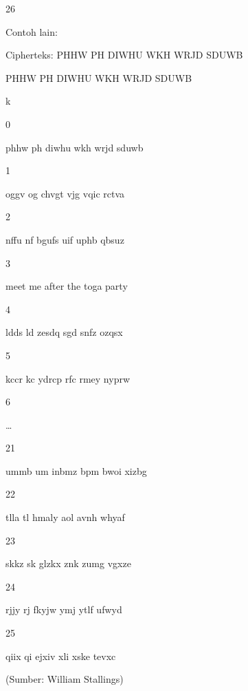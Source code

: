 \documentclass{article}
\begin{document}

26

Contoh lain: 

Cipherteks: PHHW PH DIWHU WKH WRJD SDUWB



PHHW PH DIWHU WKH WRJD SDUWB

k

0 

phhw ph diwhu wkh wrjd sduwb 

1 

oggv og chvgt vjg vqic rctva

2 

nffu nf bgufs uif uphb qbsuz

3 

 meet me after the toga party

4 

ldds ld zesdq sgd snfz ozqsx

5 

kccr kc ydrcp rfc rmey nyprw

6 

…

21 

ummb um inbmz bpm bwoi xizbg

22 

tlla tl hmaly aol avnh whyaf

23 

skkz sk glzkx znk zumg vgxze

24 

rjjy rj fkyjw ymj ytlf ufwyd

25 

qiix qi ejxiv xli xske tevxc

(Sumber: William Stallings)
\end{document}
